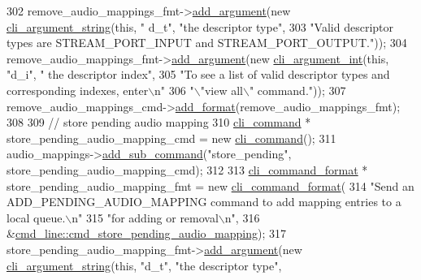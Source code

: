 \begin{DoxyCode}
302     remove\_audio\_mappings\_fmt->\hyperlink{classcli__command__format_ac3fc6d13a227c195d5ee6f7b78eba9cd}{add\_argument}(\textcolor{keyword}{new} \hyperlink{classcli__argument__string}{cli\_argument\_string}(\textcolor{keyword}{this}, \textcolor{stringliteral}{"
      d\_t"}, \textcolor{stringliteral}{"the descriptor type"},
303                                                                     \textcolor{stringliteral}{"Valid descriptor types are
       STREAM\_PORT\_INPUT and STREAM\_PORT\_OUTPUT."}));
304     remove\_audio\_mappings\_fmt->\hyperlink{classcli__command__format_ac3fc6d13a227c195d5ee6f7b78eba9cd}{add\_argument}(\textcolor{keyword}{new} \hyperlink{classcli__argument__int}{cli\_argument\_int}(\textcolor{keyword}{this}, \textcolor{stringliteral}{"d\_i"}, \textcolor{stringliteral}{"
      the descriptor index"},
305                                                                  \textcolor{stringliteral}{"To see a list of valid descriptor types
       and corresponding indexes, enter\(\backslash\)n"}
306                                                                  \textcolor{stringliteral}{"\(\backslash\)"view all\(\backslash\)" command."}));
307     remove\_audio\_mappings\_cmd->\hyperlink{classcli__command_aa9ec38e761644d946f8db2b920e39921}{add\_format}(remove\_audio\_mappings\_fmt);
308 
309     \textcolor{comment}{// store pending audio mapping}
310     \hyperlink{classcli__command}{cli\_command} * store\_pending\_audio\_mapping\_cmd = \textcolor{keyword}{new} \hyperlink{classcli__command}{cli\_command}();
311     audio\_mappings->\hyperlink{classcli__command_aa73a67e8ebb6facd4b40ced66279b226}{add\_sub\_command}(\textcolor{stringliteral}{"store\_pending"}, store\_pending\_audio\_mapping\_cmd);
312 
313     \hyperlink{classcli__command__format}{cli\_command\_format} * store\_pending\_audio\_mapping\_fmt = \textcolor{keyword}{new} 
      \hyperlink{classcli__command__format}{cli\_command\_format}(
314         \textcolor{stringliteral}{"Send an ADD\_PENDING\_AUDIO\_MAPPING command to add mapping entries to a local queue.\(\backslash\)n"}
315         \textcolor{stringliteral}{"for adding or removal\(\backslash\)n"},
316         &\hyperlink{classcmd__line_a6441ee5267b15302307a0996c251da4e}{cmd\_line::cmd\_store\_pending\_audio\_mapping});
317     store\_pending\_audio\_mapping\_fmt->\hyperlink{classcli__command__format_ac3fc6d13a227c195d5ee6f7b78eba9cd}{add\_argument}(\textcolor{keyword}{new} 
      \hyperlink{classcli__argument__string}{cli\_argument\_string}(\textcolor{keyword}{this}, \textcolor{stringliteral}{"d\_t"}, \textcolor{stringliteral}{"the descriptor type"},

\end{DoxyCode}
